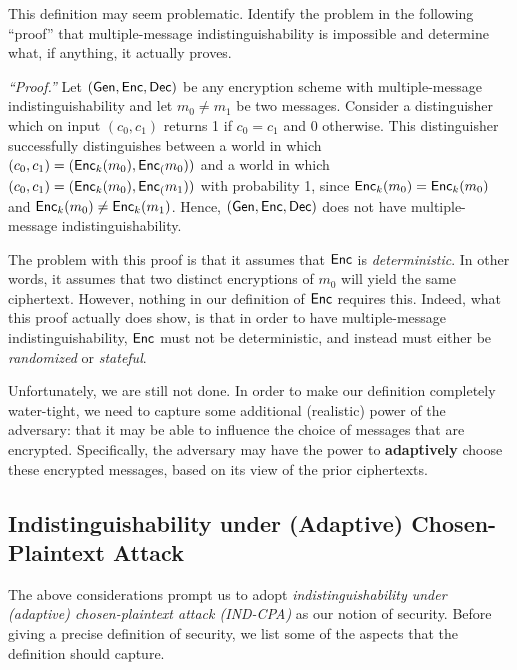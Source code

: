 \documentclass[11pt]{article}
\begin{document}
\begin{question}
  This definition may seem problematic. Identify the problem in the
  following ``proof'' that multiple-message indistinguishability is
  impossible and determine what, if
  anything, it actually proves.

  \medskip\noindent \emph{``Proof.''} Let
  \((\mathsf{Gen}, \mathsf{Enc}, \mathsf{Dec})\) be any encryption scheme with
  multiple-message indistinguishability and let \(m_0 \neq m_1\) be
  two messages. Consider a distinguisher which on input \((c_0, c_1)\)
  returns 1 if \(c_0 = c_1\) and 0 otherwise. This distinguisher
  successfully distinguishes between a world in which
  \((c_0, c_1) = (\mathsf{Enc}_k(m_0), \mathsf{Enc}_(m_0))\) and a world in
  which \((c_0, c_1) = (\mathsf{Enc}_k(m_0), \mathsf{Enc}_(m_1))\) with
  probability 1, since \(\mathsf{Enc}_k(m_0) = \mathsf{Enc}_k(m_0)\) and
  \(\mathsf{Enc}_k(m_0) \neq \mathsf{Enc}_k(m_1)\).  Hence,
  \((\mathsf{Gen}, \mathsf{Enc}, \mathsf{Dec})\) does not have multiple-message
  indistinguishability.
\end{question}

\begin{answer}
  The problem with this proof is that it assumes that \(\mathsf{Enc}\) is
  \emph{deterministic}. In other words, it assumes that two distinct
  encryptions of \(m_0\) will yield the same ciphertext. However,
  nothing in our definition of \(\mathsf{Enc}\) requires this. Indeed, what
  this proof actually does show, is that in order to have
  multiple-message indistinguishability, \(\mathsf{Enc}\) must not be
  deterministic, and instead must either be \emph{randomized} or
  \emph{stateful}.
\end{answer}

Unfortunately, we are still not done.  In order to make our definition
completely water-tight, we need to capture some additional (realistic)
power of the adversary: that it may be able to influence the choice of
messages that are encrypted.  Specifically, the adversary may have the
power to \textbf{adaptively} choose these encrypted messages, based on
its view of the prior ciphertexts. 

\subsection{Indistinguishability under (Adaptive) Chosen-Plaintext Attack}
\label{sec:indist-under-chos}

The above considerations prompt us to adopt
\textit{indistinguishability under (adaptive) chosen-plaintext attack
  (IND-CPA)} as our notion of security.  Before giving a precise
definition of security, we list some of the aspects that the
definition should capture.
\end{document}
